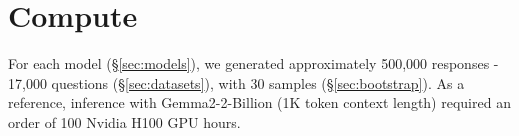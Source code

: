 \section{Compute}
\label{sec:appendix-compute}

For each model (\S\ref{sec:models}), we generated approximately 500,000 responses - 17,000 questions (\S\ref{sec:datasets}), with 30 samples (\S\ref{sec:bootstrap}). As a reference, inference with Gemma2-2-Billion (1K token context length) required an order of 100 Nvidia H100 GPU hours. 